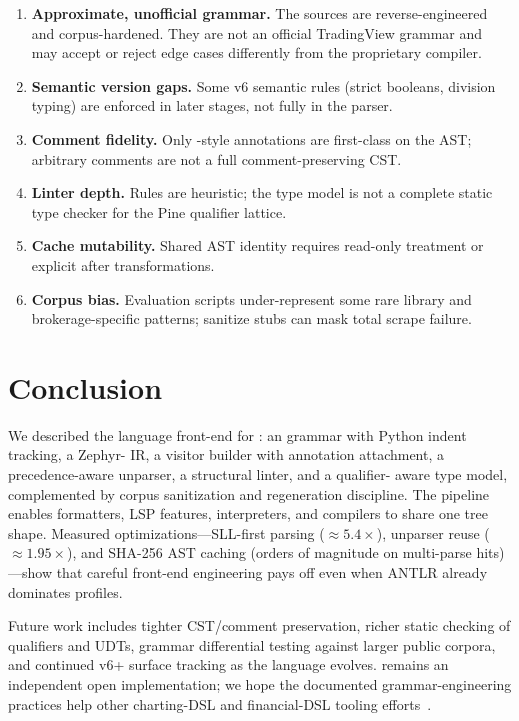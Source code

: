 \documentclass[11pt,a4paper]{article}
\begin{document}
\begin{enumerate}[leftmargin=*]
  \item \textbf{Approximate, unofficial grammar.}
    The  sources are reverse-engineered and corpus-hardened. They are
    not an official TradingView grammar and may accept or reject edge cases
    differently from the proprietary compiler.
  \item \textbf{Semantic version gaps.}
    Some v6 semantic rules (strict booleans, division typing) are enforced in
    later stages, not fully in the parser.
  \item \textbf{Comment fidelity.}
    Only -style annotations are first-class on the AST; arbitrary
    comments are not a full comment-preserving CST.
  \item \textbf{Linter depth.}
    Rules are heuristic; the type model is not a complete static type checker
    for the Pine qualifier lattice.
  \item \textbf{Cache mutability.}
    Shared AST identity requires read-only treatment or explicit
     after transformations.
  \item \textbf{Corpus bias.}
    Evaluation scripts under-represent some rare library and brokerage-specific
    patterns; sanitize stubs can mask total scrape failure.
\end{enumerate}

\section{Conclusion}
\label{sec:conclusion}

We described the \pyne{} language front-end for \pine{}: an \antlr{} grammar with
Python indent tracking, a Zephyr-\asdl{} IR, a visitor builder with annotation
attachment, a precedence-aware unparser, a structural linter, and a qualifier-
aware type model, complemented by corpus sanitization and regeneration
discipline.
The pipeline enables formatters, LSP features, interpreters, and compilers to
share one tree shape. Measured optimizations---SLL-first parsing
(\(\approx 5.4\times\)), unparser reuse (\(\approx 1.95\times\)), and SHA-256
AST caching (orders of magnitude on multi-parse hits)---show that careful
front-end engineering pays off even when ANTLR already dominates profiles.

Future work includes tighter CST/comment preservation, richer static checking of
qualifiers and UDTs, grammar differential testing against larger public corpora,
and continued v6+ surface tracking as the language evolves.
\pyne{} remains an independent open implementation; we hope the documented
grammar-engineering practices help other charting-DSL and financial-DSL tooling
efforts~\citep{pynescript2026}.
\end{document}
